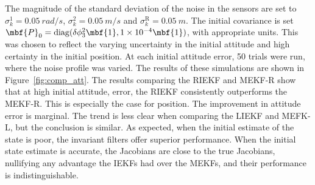 The magnitude of the standard deviation of the noise in the sensors are set to $\sigma_k^1 = \SI{0.05}{rad/s}$, $\sigma_k^2 = \SI{0.05}{m/s}$ and $\sigma_k^\mathrm{R} = \SI{0.05}{m}$. The initial covariance is set $\mbf{P}_0 = \mathrm{diag}(\delta \phi_3^2\mbf{1},1 \times 10^{-4}\mbf{1})$, with appropriate units. This was chosen to reflect the varying uncertainty in the initial attitude and high certainty in the initial position. At each initial attitude error, 50 trials were run, where the noise profile was varied. The results of these simulations are shown in Figure~\ref{fig:comp_att}. The results comparing the RIEKF and MEKF-R show that at high initial attitude, error, the RIEKF consistently outperforms the MEKF-R. This is especially the case for position. The improvement in attitude error is marginal. The trend is less clear when comparing the LIEKF and MEFK-L, but the conclusion is similar. As expected, when the initial estimate of the state is poor, the invariant filters offer superior performance.  When the initial state estimate is accurate, the Jacobians are close to the true Jacobians, nullifying any advantage the IEKFs had over the MEKFs, and their performance is indistinguishable.
